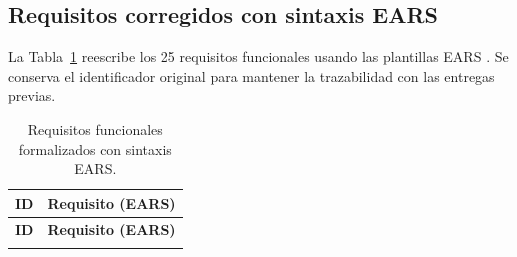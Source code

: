 \documentclass[11pt,a4paper]{article}
\renewcommand{\_}{\textunderscore\allowbreak}
\begin{document}
\subsection{Requisitos corregidos con sintaxis EARS}
La Tabla~\ref{tab:ears} reescribe los 25 requisitos funcionales usando las plantillas EARS \cite{mavin2009}. Se conserva el identificador original para mantener la trazabilidad con las entregas previas.

\renewcommand{\arraystretch}{1.2}

\begin{longtable}{|p{1.3cm}|p{13.2cm}|}
\caption{Requisitos funcionales formalizados con sintaxis EARS.}
\label{tab:ears}\\
\hline
\textbf{ID} & \textbf{Requisito (EARS)}\\
\hline
\endfirsthead

\hline
\textbf{ID} & \textbf{Requisito (EARS)}\\
\hline
\endhead

\hline
\endfoot

\hline
\endlastfoot


\end{longtable}
\end{document}
